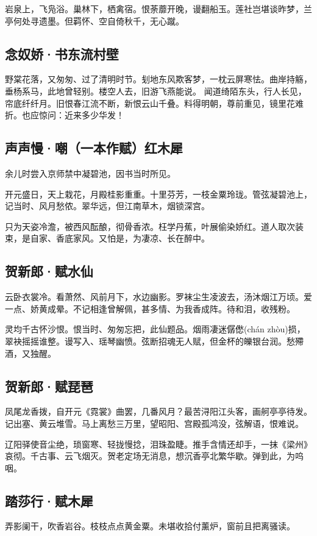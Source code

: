 \documentclass[a5paper]{ctexart}
\begin{document}
	岩泉上，飞凫浴。巢林下，栖禽宿。恨荼蘼开晚，谩翻船玉。莲社岂堪谈昨梦，兰亭何处寻遗墨。但羁怀、空自倚秋千，无心蹴。
	
	\subsection{念奴娇·书东流村壁}
	野棠花落，又匆匆、过了清明时节。刬地东风欺客梦，一枕云屏寒怯。曲岸持觞，垂杨系马，此地曾轻别。楼空人去，旧游飞燕能说。
	闻道绮陌东头，行人长见，帘底纤纤月。旧恨春江流不断，新恨云山千叠。料得明朝，尊前重见，镜里花难折。也应惊问：近来多少华发！
	
	\subsection{声声慢·嘲（一本作赋）红木犀}
	\begin{small}
		余儿时尝入京师禁中凝碧池，因书当时所见。
	\end{small}
	
	开元盛日，天上栽花，月殿桂影重重。十里芬芳，一枝金粟玲珑。管弦凝碧池上，记当时、风月愁侬。翠华远，但江南草木，烟锁深宫。
	
	只为天姿冷澹，被西风酝酿，彻骨香浓。枉学丹蕉，叶展偷染娇红。道人取次装束，是自家、香底家风。又怕是，为凄凉、长在醉中。
	
	\subsection{贺新郎·赋水仙}
	云卧衣裳冷。看萧然、风前月下，水边幽影。罗袜尘生凌波去，汤沐烟江万顷。爱一点、娇黄成晕。不记相逢曾解佩，甚多情、为我香成阵。待和泪，收残粉。
	
	灵均千古怀沙恨。恨当时、匆匆忘把，此仙题品。烟雨凄迷僝僽(chán zhòu)损，翠袂摇摇谁整。谩写入、瑶琴幽愤。弦断招魂无人赋，但金杯的皪银台润。愁殢酒，又独醒。
	
	\subsection{贺新郎·赋琵琶}
	凤尾龙香拨，自开元《霓裳》曲罢，几番风月？最苦浔阳江头客，画舸亭亭待发。记出塞、黄云堆雪。马上离愁三万里，望昭阳、宫殿孤鸿没，弦解语，恨难说。
	
	辽阳驿使音尘绝，琐窗寒、轻拢慢捻，泪珠盈睫。推手含情还却手，一抹《梁州》哀彻。千古事、云飞烟灭。贺老定场无消息，想沉香亭北繁华歇。弹到此，为呜咽。
	
	\subsection{踏莎行·赋木犀}
	弄影阑干，吹香岩谷。枝枝点点黄金粟。未堪收拾付薰炉，窗前且把离骚读。
	
\end{document}
